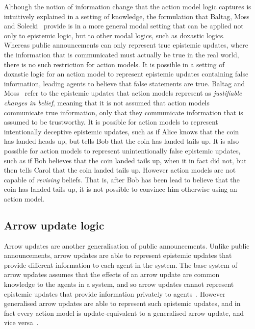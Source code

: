 Although the notion of information change that the action model logic captures is intuitively explained in a setting of knowledge, the formulation that Baltag, Moss and Solecki~\cite{baltag:1998} provide is in a more general modal setting that can be applied not only to epistemic logic, but to other modal logics, such as doxastic logics.
Whereas public announcements can only represent true epistemic updates, where the information that is communicated must actually be true in the real world, there is no such restriction for action models.
It is possible in a setting of doxastic logic for an action model to represent epistemic updates containing false information, leading agents to believe that false statements are true.
Baltag and Moss~\cite{baltag:2004} refer to the epistemic updates that action models represent as {\em justifiable changes in belief}, meaning that it is not assumed that action models communicate true information, only that they communicate information that is assumed to be trustworthy.
It is possible for action models to represent intentionally deceptive epistemic updates, such as if Alice knows that the coin has landed heads up, but tells Bob that the coin has landed tails up.
It is also possible for action models to represent unintentionally false epistemic updates, such as if Bob believes that the coin landed tails up, when it in fact did not, but then tells Carol that the coin landed tails up. 
However action models are not capable of {\em revising} beliefs.
That is, after Bob has been lead to believe that the coin has landed tails up, it is not possible to convince him otherwise using an action model.

\subsection{Arrow update logic}

Arrow updates are another generalisation of public announcements.
Unlike public announcements, arrow updates are able to represent epistemic updates that provide different information to each agent in the system.
The base system of arrow updates assumes that the effects of an arrow update are common knowledge to the agents in a system, and so arrow updates cannot represent epistemic updates that provide information privately to agents~\cite{kooi:2011a}.
However generalised arrow updates are able to represent such epistemic updates, and in fact every action model is update-equivalent to a generalised arrow update, and vice versa~\cite{kooi:2011b}.

